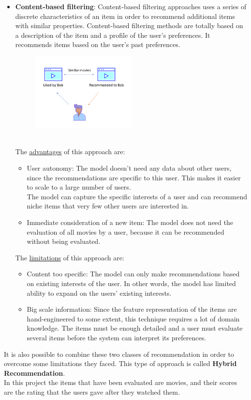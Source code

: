 \documentclass{article}
\begin{document}
\begin{itemize}
      \item \textbf{Content-based filtering}: Content-based filtering approaches uses a series of discrete characteristics of an item in order to recommend additional items with similar properties. Content-based filtering methods are totally based on a description of the item and a profile of the user’s preferences. It recommends items based on the user’s past preferences.\\
      \begin{figure}[ht]
            \begin{center}
                  \includegraphics[width=0.5\textwidth]{images/Content-based filtering.png}
            \end{center}
      \end{figure}\\
      The \underline{advantages} of this approach are:
      \begin{itemize}
            \item User autonomy: The model doesn't need any data about other users, since the recommendations are specific to this user. This makes it easier to scale to a large number of users.\\The model can capture the specific interests of a user and can recommend niche items that very few other users are interested in.
            \item Immediate consideration of a new item: The model does not need the evaluation of all movies by a user, because it can be recommended without being evaluated.
      \end{itemize}
      The \underline{limitations} of this approach are:
      \begin{itemize}
            \item Content too specific: The model can only make recommendations based on existing interests of the user. In other words, the model has limited ability to expand on the users' existing interests.
            \item Big scale information: Since the feature representation of the items are hand-engineered to some extent, this technique requires a lot of domain knowledge. The items must be enough detailed and a user must evaluate several items before the system can interpret its preferences.
      \end{itemize}
\end{itemize}
It is also possible to combine these two classes of recommendation in order to overcome some limitations they faced. This type of approach is called \textbf{Hybrid Recommendation}.\\
In this project the items that have been evaluated are movies, and their scores are the rating that the users gave after they watched them.
\end{document}
